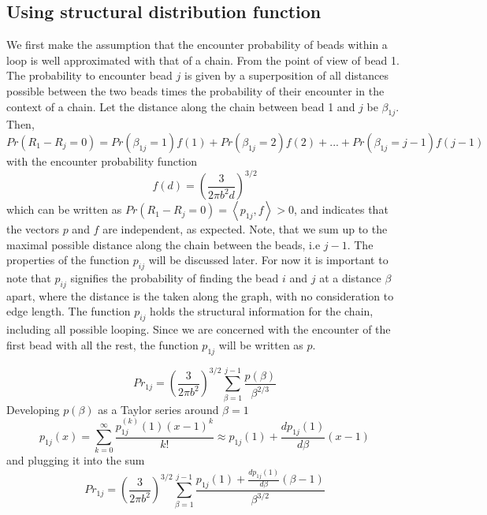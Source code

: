 \documentclass[12pt]{article}
\begin{document}
\subsection{Using structural distribution function}\label{subsection_usingStructuralDistributionFunction}
We first make the assumption that the encounter probability of beads within a loop is well approximated with that of a chain. From the point of view of bead 1. The probability to encounter bead $j$ is given by a superposition of all distances possible between the two beads times the probability of their encounter in the context of a chain. Let the distance along the chain between bead 1 and $j$ be $\beta_{1j}$. Then,
\begin{equation*}
Pr(R_1-R_j=0)=Pr(\beta_{1j}=1)f(1)+Pr(\beta_{1j}=2)f(2)+...+Pr(\beta_{1j}=j-1)f(j-1)
\end{equation*}
with the encounter probability function 
\begin{equation*}
f(d) = \left(\frac{3}{2\pi b^2 d}\right)^{3/2}
\end{equation*}
which can be written as $Pr(R_1-R_j=0)=\left<p_{1j},f\right> >0$, and indicates that the vectors $p$ and $f$ are independent, as expected. Note, that we sum up to the maximal possible distance along the chain between the beads, i.e $j-1$.
The properties of the function $p_{ij}$ will be discussed later. For now it is important to note that $p_{ij}$ signifies the probability of finding the bead $i$ and $j$ at a distance $\beta$ apart, where the distance is the taken along the graph, with no consideration to edge length. The function $p_{ij}$  holds the structural information for the chain, including all possible looping. Since we are concerned with the encounter of the first bead with all the rest, the function $p_{1j}$ will be written as $p$. 

\begin{equation*}
Pr_{1j}=\left(\frac{3}{2\pi b^2}\right)^{3/2}\sum_{\beta=1}^{j-1}\frac{p(\beta)}{\beta^{2/3}}
\end{equation*}
Developing $p(\beta)$ as a Taylor series around $\beta=1$
\begin{equation*}
p_{1j}(x)=\sum_{k=0}^{\infty}\frac{p_{1j}^{(k)}(1)(x-1)^k}{k!}\approx p_{1j}(1)+\frac{dp_{1j}(1)}{d\beta}(x-1)
\end{equation*}
and plugging it into the sum
\begin{equation*}
Pr_{1j}=\left(\frac{3}{2\pi b^2}\right)^{3/2}\sum_{\beta=1}^{j-1}\frac{p_{1j}(1)+\frac{dp_{1j}(1)}{d\beta} (\beta-1)}{\beta^{3/2}}
\end{equation*}
\end{document}
